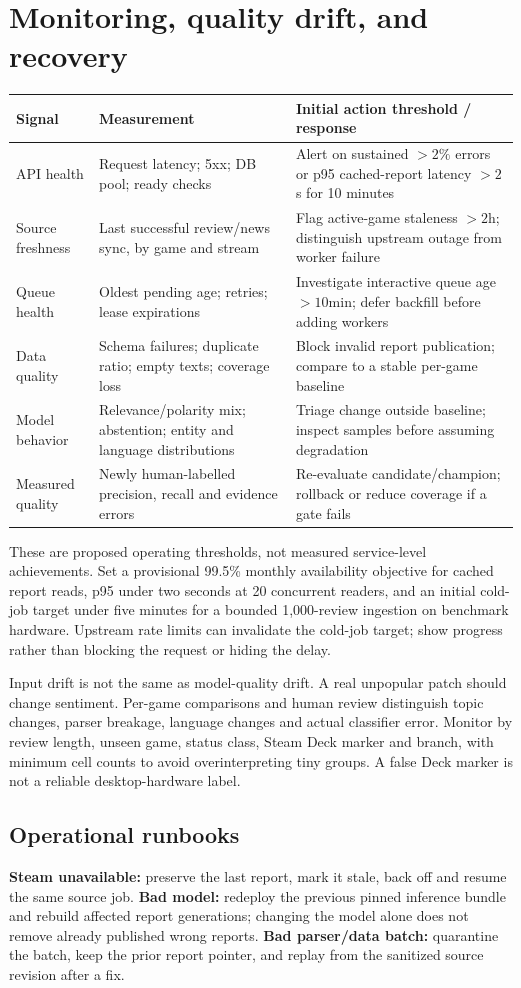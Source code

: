 \documentclass[10pt,letterpaper]{article}
\newcommand{\key}[1]{\textbf{\color{ink}#1}}
\newcommand{\nextsection}[1]{\clearpage\section{#1}}
\begin{document}
\nextsection{Monitoring, quality drift, and recovery}
\begin{tabularx}{\linewidth}{p{1.0in}YY}
\toprule
Signal & Measurement & Initial action threshold / response \\
\midrule
API health & Request latency; 5xx; DB pool; ready checks & Alert on sustained $>2\%$ errors or p95 cached-report latency $>2$s for 10 minutes \\
Source freshness & Last successful review/news sync, by game and stream & Flag active-game staleness $>2$h; distinguish upstream outage from worker failure \\
Queue health & Oldest pending age; retries; lease expirations & Investigate interactive queue age $>10$min; defer backfill before adding workers \\
Data quality & Schema failures; duplicate ratio; empty texts; coverage loss & Block invalid report publication; compare to a stable per-game baseline \\
Model behavior & Relevance/polarity mix; abstention; entity and language distributions & Triage change outside baseline; inspect samples before assuming degradation \\
Measured quality & Newly human-labelled precision, recall and evidence errors & Re-evaluate candidate/champion; rollback or reduce coverage if a gate fails \\
\bottomrule
\end{tabularx}

These are proposed operating thresholds, not measured service-level achievements. Set a provisional 99.5\% monthly availability objective for cached report reads, p95 under two seconds at 20 concurrent readers, and an initial cold-job target under five minutes for a bounded 1,000-review ingestion on benchmark hardware. Upstream rate limits can invalidate the cold-job target; show progress rather than blocking the request or hiding the delay.

Input drift is not the same as model-quality drift. A real unpopular patch should change sentiment. Per-game comparisons and human review distinguish topic changes, parser breakage, language changes and actual classifier error. Monitor by review length, unseen game, status class, Steam Deck marker and branch, with minimum cell counts to avoid overinterpreting tiny groups. A false Deck marker is not a reliable desktop-hardware label.

\subsection{Operational runbooks}
\key{Steam unavailable:} preserve the last report, mark it stale, back off and resume the same source job. \key{Bad model:} redeploy the previous pinned inference bundle and rebuild affected report generations; changing the model alone does not remove already published wrong reports. \key{Bad parser/data batch:} quarantine the batch, keep the prior report pointer, and replay from the sanitized source revision after a fix.
\end{document}
